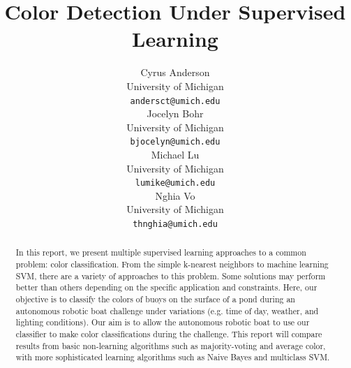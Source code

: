 \documentclass{article} %
\title{Color Detection Under Supervised Learning}
\author{
Cyrus Anderson \\
University of Michigan \\
\texttt{andersct@umich.edu} \\
\And
Jocelyn Bohr \\
University of Michigan \\
\texttt{bjocelyn@umich.edu} \\
\AND
Michael Lu \\
University of Michigan \\
\texttt{lumike@umich.edu} \\
\And
Nghia Vo \\
University of Michigan \\
\texttt{thnghia@umich.edu} \\
}
\begin{document}
\maketitle

\begin{abstract}
In this report, we present multiple supervised learning approaches to a common problem: color classification. From the simple k-nearest neighbors to machine learning SVM, there are a variety of approaches to this problem. Some solutions may perform better than others depending on the specific application and constraints. Here, our objective is to classify the colors of buoys on the surface of a pond during an autonomous robotic boat challenge under variations (e.g. time of day, weather, and lighting conditions). Our aim is to allow the autonomous robotic boat to use our classifier to make color classifications during the challenge. This report will compare results from basic non-learning algorithms such as majority-voting and average color, with more sophisticated learning algorithms such as Naive Bayes and multiclass SVM. 
\end{abstract}
\end{document}
